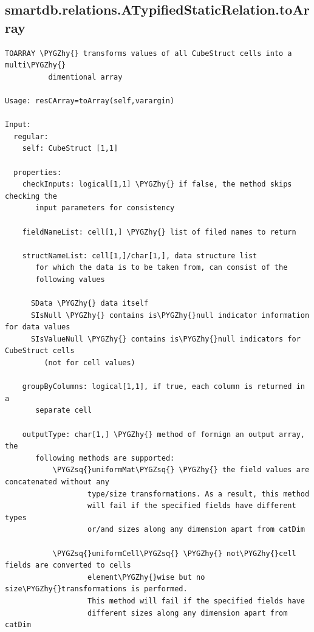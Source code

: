 \documentclass[letterpaper,10pt,english]{sphinxmanual}
\def\PYGZhy{\char`\-}
\def\PYGZsq{\char`\'}
\begin{document}
\subsection{smartdb.relations.ATypifiedStaticRelation.toArray}
\label{chap_functions:smartdb-relations-atypifiedstaticrelation-toarray}
\begin{Verbatim}[commandchars=\\\{\}]
TOARRAY \PYGZhy{} transforms values of all CubeStruct cells into a multi\PYGZhy{}
          dimentional array

Usage: resCArray=toArray(self,varargin)

Input:
  regular:
    self: CubeStruct [1,1]

  properties:
    checkInputs: logical[1,1] \PYGZhy{} if false, the method skips checking the
       input parameters for consistency

    fieldNameList: cell[1,] \PYGZhy{} list of filed names to return

    structNameList: cell[1,]/char[1,], data structure list
       for which the data is to be taken from, can consist of the
       following values

      SData \PYGZhy{} data itself
      SIsNull \PYGZhy{} contains is\PYGZhy{}null indicator information for data values
      SIsValueNull \PYGZhy{} contains is\PYGZhy{}null indicators for CubeStruct cells
         (not for cell values)

    groupByColumns: logical[1,1], if true, each column is returned in a
       separate cell

    outputType: char[1,] \PYGZhy{} method of formign an output array, the
       following methods are supported:
           \PYGZsq{}uniformMat\PYGZsq{} \PYGZhy{} the field values are concatenated without any
                   type/size transformations. As a result, this method
                   will fail if the specified fields have different types
                   or/and sizes along any dimension apart from catDim

           \PYGZsq{}uniformCell\PYGZsq{} \PYGZhy{} not\PYGZhy{}cell fields are converted to cells
                   element\PYGZhy{}wise but no size\PYGZhy{}transformations is performed.
                   This method will fail if the specified fields have
                   different sizes along any dimension apart from catDim


\end{Verbatim}
\end{document}
